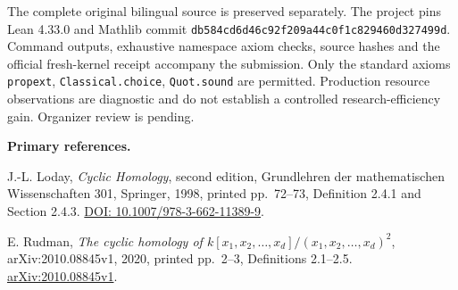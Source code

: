 \documentclass[10pt,a4paper]{article}
\begin{document}
The complete original bilingual source is preserved separately.
The project pins Lean 4.33.0 and Mathlib commit
\texttt{db584cd6d46c92f209a44c0f1c829460d327499d}.
Command outputs, exhaustive namespace axiom checks, source hashes and the
official fresh-kernel receipt accompany the submission. Only the standard
axioms \texttt{propext}, \texttt{Classical.choice}, \texttt{Quot.sound}
are permitted. Production resource observations are diagnostic and do not
establish a controlled research-efficiency gain. Organizer review is pending.

\textbf{Primary references.}

J.-L. Loday, \emph{Cyclic Homology}, second edition, Grundlehren der
mathematischen Wissenschaften 301, Springer, 1998, printed pp.~72--73,
Definition 2.4.1 and Section 2.4.3.
\href{https://doi.org/10.1007/978-3-662-11389-9}{DOI: 10.1007/978-3-662-11389-9}.

E. Rudman, \emph{The cyclic homology of
$k[x_1,x_2,\ldots,x_d]/(x_1,x_2,\ldots,x_d)^2$},
arXiv:2010.08845v1, 2020, printed pp.~2--3, Definitions 2.1--2.5.
\href{https://arxiv.org/abs/2010.08845v1}{arXiv:2010.08845v1}.
\end{document}
